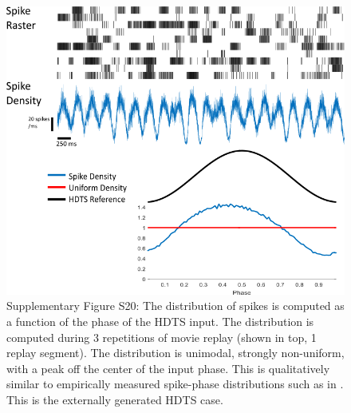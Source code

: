 \documentclass[11pt]{article} %
\begin{document}
\begin{figure}
\centering
\includegraphics[scale=0.85]{FFIGS21}
\caption*{Supplementary Figure S20:  The distribution of spikes is computed as a function of the phase of the HDTS input.  The distribution is computed during 3 repetitions of movie replay (shown in top, 1 replay segment).  The distribution is unimodal, strongly non-uniform, with a peak off the center of the input phase.  This is qualitatively similar to empirically measured spike-phase distributions such as in \cite{mizu}.  This is the externally generated HDTS case. } 
\end{figure}
\end{document}
